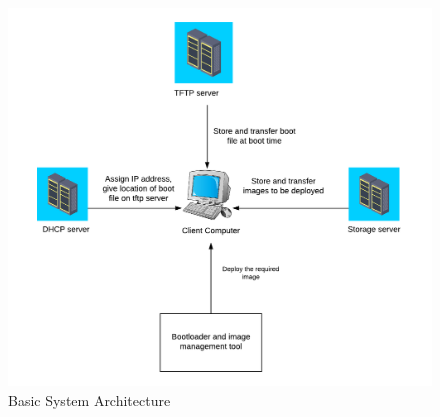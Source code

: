 \documentclass[a4paper,12pt]{article}
\begin{document}
 \begin{figure}[h!]
    \centering
    \includegraphics[width=\linewidth]{architecture.png}
    \caption{Basic System Architecture}
    \label{fig:Use case}
\end{figure}
\newpage

\end{document}
